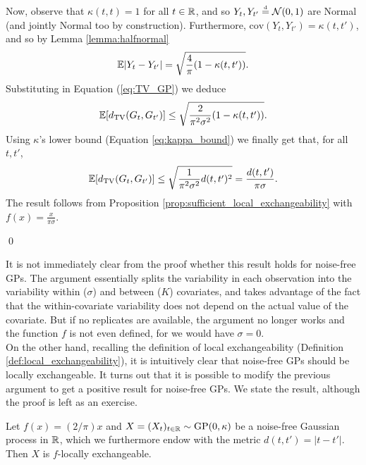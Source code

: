 Now, observe that $\kappa(t, t) = 1$ for all $t \in \mathbb{R}$, and so $Y_t, Y_{t'} \stackrel{\text{\rm\tiny d}}{=} \mathcal{N}(0, 1)$ are Normal (and jointly Normal too by construction). Furthermore, $\mathrm{cov}(Y_t, Y_{t'}) = \kappa(t, t')$, and so by Lemma \ref{lemma:halfnormal}
\begin{equation*}
	\mathbb{E} |Y_t - Y_{t'}| = \sqrt{\frac{4}{\pi}(1 - \kappa(t, t'))}.
\end{equation*}
Substituting in Equation (\ref{eq:TV_GP}) we deduce
\begin{equation} \label{eq:TV_GP_2}
	\mathbb{E} [d_{\mathrm{TV}} (G_t , G_{t'} )] \leq \sqrt{\frac{2}{\pi^2 \sigma^2}(1 - \kappa(t, t'))}.
\end{equation}
Using $\kappa$'s lower bound (Equation \ref{eq:kappa_bound}) we finally get that, for all $t, t'$,
\begin{equation}
	\mathbb{E} [d_{\mathrm{TV}} (G_t , G_{t'} )] \leq \sqrt{\frac{1}{\pi^2 \sigma^2}d(t, t')^2} = \frac{d(t, t')}{\pi \sigma}.
\end{equation}
The result follows from Proposition \ref{prop:sufficient_local_exchangeability} with $f(x) = \frac{x}{\pi \sigma}$.

\qed


\vskip 0.25cm

It is not immediately clear from the proof whether this result holds for noise-free GPs. The argument essentially splits the variability in each observation into the variability within ($\sigma$) and between ($K$) covariates, and takes advantage of the fact that the within-covariate variability does not depend on the actual value of the covariate. But if no replicates are available, the argument no longer works and the function $f$ is not even defined, for we would have $\sigma = 0$. \\

On the other hand, recalling the definition of local exchangeability (Definition \ref{def:local_exchangeability}), it is intuitively clear that noise-free GPs should be locally exchangeable. It turns out that it is possible to modify the previous argument to get a positive result for noise-free GPs. We state the result, although the proof is left as an exercise.



\begin{proposition} \label{prop:GP_NF_local_exchangeable}
	Let $f(x) = (2/\pi) x$ and $X = (X_t)_{t \in \mathbb{R}} \sim \mathrm{GP} (0, \kappa)$ be a noise-free Gaussian process in $\mathbb{R}$, which we furthermore endow with the metric  $d(t, t') = |t-t'|$. Then $X$ is $f$-locally exchangeable.
\end{proposition}

